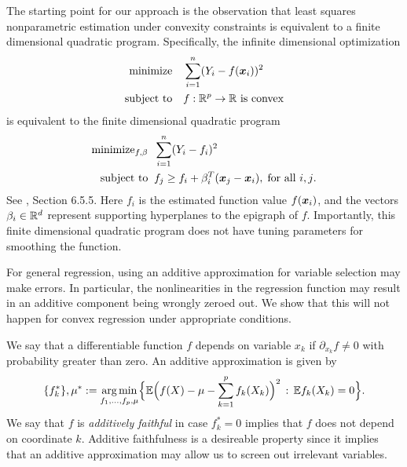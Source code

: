 The starting point for our approach is the observation that least squares
nonparametric estimation under convexity constraints is equivalent to
a finite dimensional quadratic program.  Specifically, the infinite
dimensional optimization 
\begin{align}
\begin{split}
\text{minimize} & \quad \sum_{i=1}^n (Y_i - f(\mbox{\boldmath $x$}_i))^2 \\
\text{subject to} &  \quad f:{\mathbb R}^p\rightarrow{\mathbb R}\ \text{is
  convex}
\end{split}
\end{align}
is equivalent to the finite dimensional quadratic
program 
\begin{align}
\label{eq:convreg}
\begin{split}
\text{minimize}_{f, \beta} & \;\; \sum_{i=1}^n (Y_i - f_i)^2 \\
\text{subject to} & \;\; f_j \geq f_i + \beta_i^T (\mbox{\boldmath $x$}_j-\mbox{\boldmath $x$}_i),\; \text{for
    all $i,j$}.
\end{split}
\end{align}
See \cite{Boyd04}, Section 6.5.5.
Here $f_i$ is the estimated function value $f(\mbox{\boldmath $x$}_i)$, and the vectors
$\beta_i \in {\mathbb R}^d$ represent supporting hyperplanes to the
epigraph of $f$.  Importantly, this finite dimensional quadratic program does
not have tuning parameters for smoothing the function. 

For general regression, using an additive approximation for variable
selection may make errors.  In particular, the nonlinearities in the
regression function may result in an additive component being wrongly
zeroed out.  We show that this will not happen for convex regression
under appropriate conditions.

We say that a differentiable function $f$ depends on variable $x_k$ if
$\partial_{x_k} f \neq 0$ with probability greater than zero.  An additive approximation is given by
\begin{equation}
\{f_k^*\}, \mu^* := \mathop{\text{\rm arg\,min}}_{f_1,\ldots, f_p, \mu} \Bigl\{ 
             {\mathbb E} \Bigl( f(X) - \mu - \sum_{k=1}^p f_k(X_k)\Bigr)^2 
         \,:\, {\mathbb E} f_k(X_k) = 0 \Bigr\}.
\end{equation}
We say that $f$ is \textit{additively faithful} in case $f^*_k = 0$
implies that $f$ does not depend on coordinate $k$.
Additive faithfulness is a desireable property
since it implies that an additive approximation may allow us to 
screen out irrelevant variables.

